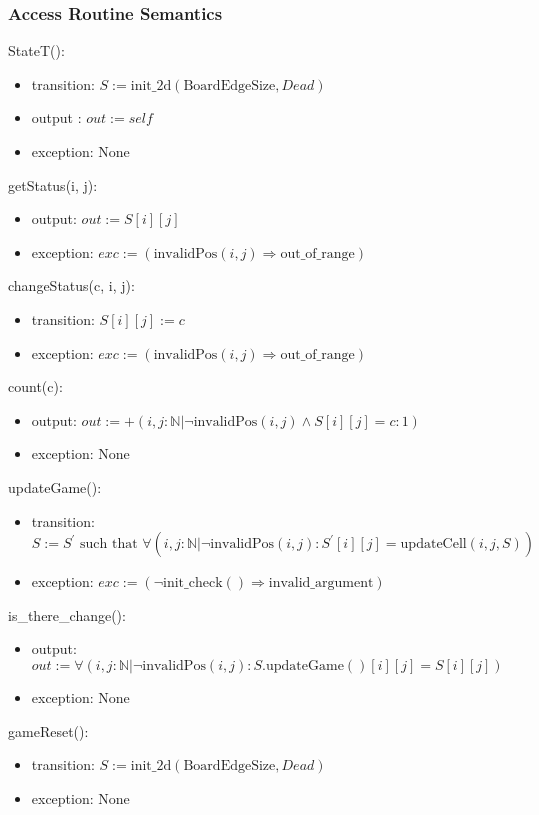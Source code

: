 \documentclass[12pt]{article}
\begin{document}
\subsubsection* {Access Routine Semantics}
\noindent StateT():
\begin{itemize}
\item transition: $S := \mbox{init\_2d}(\mbox{BoardEdgeSize}, Dead)$
\item output : $\mathit{out} := self$ 
\item exception: None
\end{itemize}
\noindent getStatus(i, j):
\begin{itemize}
\item output: $\mathit{out} := S[i][j]$
\item exception: $exc := (\mbox{invalidPos}(i, j) \Rightarrow \mbox{out\_of\_range})$
\end{itemize}
\noindent changeStatus(c, i, j):
\begin{itemize}
\item transition: $\mathit{S[i][j]} := c$
\item exception:  $exc := (\mbox{invalidPos}(i, j) \Rightarrow \mbox{out\_of\_range})$
\end{itemize}

\noindent count(c):
\begin{itemize}
\item output: $\mathit{out} :=+(i, j: \mathbb{N} | \neg \mbox{invalidPos}(i, j) \wedge S[i][j] = c : 1 )$
\item exception: None
\end{itemize}
\noindent updateGame():
\begin{itemize}
\item transition: $S := S^\prime \mbox{ such that } \forall ( i, j :\mathbb{N} | \neg \mbox{invalidPos}(i, j) : S^\prime[i][j] = \mbox{updateCell}(i, j, S))$
\item exception: $exc := (\neg \mbox{init\_check}() \Rightarrow \mbox{invalid\_argument})$
\end{itemize}
\noindent is\_there\_change():
\begin{itemize}
\item output:  $\mathit{out} :=\forall (i, j : \mathbb{N} | \neg \mbox{invalidPos}(i, j) : S.\mbox{updateGame}()[i][j] = S[i][j])$
\item exception: None
\end{itemize}
\noindent gameReset():
\begin{itemize}
\item transition:  $S := \mbox{init\_2d}(\mbox{BoardEdgeSize}, Dead)$
\item exception: None
\end{itemize}
\end{document}
